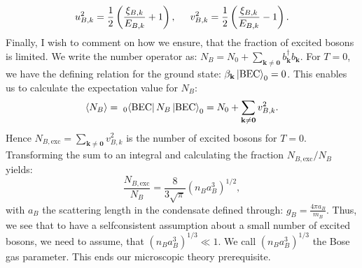 \begin{equation}
u_{B,k}^2 = \frac{1}{2}\left(\frac{\xi_{B,k}}{ E_{B,k}}+1 \right), \hspace{0.5cm} v_{B,k}^2 = \frac{1}{2}\left(\frac{\xi_{B,k}}{ E_{B,k}}-1 \right).
\end{equation}
Finally, I wish to comment on how we ensure, that the fraction of excited bosons is limited. We write the number operator as: $N_B = N_0 + \sum_{\mathbf{k}\neq \mathbf{0}} b^\dagger_{\mathbf{k}}b_{\mathbf{k}}$. For $T=0$, we have the defining relation for the ground state: $\beta_{\mathbf{k}}\ket{\text{BEC}}_0 = 0$. This enables us to calculate the expectation value for $N_B$:
\begin{equation}
\braket{N_B} =\;_{0}\!\bra{\text{BEC}} N_B \ket{\text{BEC}}_0 = N_0 + \sum_{\mathbf{k}\neq \mathbf{0}} v^2_{B,k}.\nonumber
\end{equation} 
Hence $N_{B,\text{exc}} = \sum_{\mathbf{k}\neq \mathbf{0}} v^2_{B,k}$ is the number of excited bosons for $T=0$. Transforming the sum to an integral and calculating the fraction $N_{B,\text{exc}}/N_B$ yields:
\begin{equation}
\frac{N_{B,\text{exc}}}{N_B} = \frac{8}{3\sqrt{\pi}}(n_Ba_B^3)^{1/2},
\label{eq.excitedbosonsBEC}
\end{equation}
with $a_B$ the scattering length in the condensate defined through: $g_B = \frac{4\pi a_B}{m_B}$. Thus, we see that to have a selfconsistent assumption about a small number of excited bosons, we need to assume, that $(n_Ba_B^3)^{1/3}\ll 1$. We call $(n_Ba_B^3)^{1/3}$ the Bose gas parameter. This ends our microscopic theory prerequisite. 

